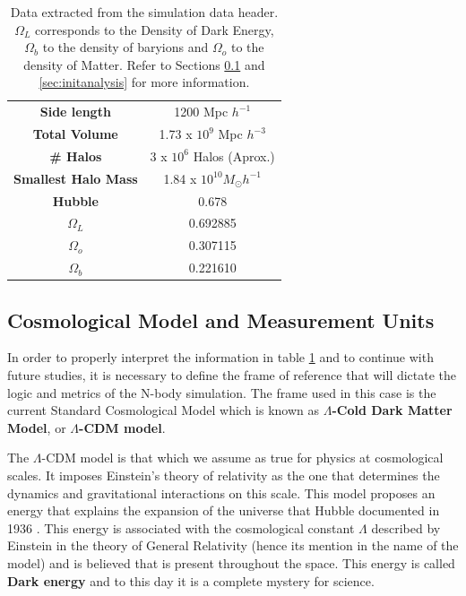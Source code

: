 \begin{table}[H]
    \centering
    \begin{tabular}{|c|c|}
    \hline
    
        \textbf{Side length} & 1200 Mpc $h^{-1}$ \\
        \textbf{Total Volume} & 1.73 x $10^9$ Mpc  $h^{-3}$\\
        \textbf{\# Halos} &  3 x $10^6$ Halos (Aprox.)\\
        \textbf{Smallest Halo Mass} & 1.84 x $10^{10} M_{\odot} h^{-1} $\\
        \textbf{Hubble} & 0.678\\
        $\Omega_L$ & 0.692885 \\
        $\Omega_o$ & 0.307115\\
        $\Omega_b$ & 0.221610\\
        
        
    \hline
    \end{tabular}
    \caption{Data extracted from the simulation data header. $\Omega_L$ corresponds to the Density of Dark Energy, $\Omega_b$ to the density of baryions and $\Omega_o$ to the density of Matter. Refer to Sections \ref{sec:units} and \ref{sec:initanalysis} for more information.}
    \label{tab:InitCondInfo}
\end{table}

\subsection{Cosmological Model and Measurement Units}
\label{sec:units}
In order to properly interpret the information in table \ref{tab:InitCondInfo} and to continue with future studies, it is necessary to define the frame of reference that will dictate the logic and metrics of the N-body simulation. The frame used in this case is the current Standard Cosmological Model which is known as \textbf{$\Lambda$-Cold Dark Matter Model}, or \textbf{$\Lambda$-CDM model}. 

The $\Lambda$-CDM model is that which we assume as true for physics at cosmological scales. It imposes Einstein's theory of relativity as the one that determines the dynamics and gravitational interactions on this scale. This model proposes an energy that explains the expansion of the universe that Hubble documented in 1936 \cite{Hubble}. This energy is associated with the cosmological constant \textbf{$\Lambda$} described by Einstein in the theory of General Relativity (hence its mention in the name of the model) and is believed that is present throughout the space. This energy is called \textbf{Dark energy} and to this day it is a complete mystery for science.


